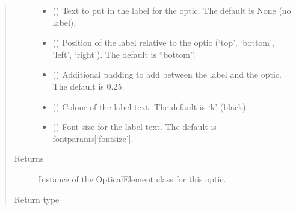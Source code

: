 \documentclass[letterpaper,10pt,english]{sphinxmanual}
\begin{document}
\begin{fulllineitems}
\begin{fulllineitems}
\begin{quote}
\begin{description}
\begin{itemize}
\item {} 
\sphinxAtStartPar
{} (\sphinxstyleliteralemphasis{\sphinxupquote{, }}) \textendash{} Text to put in the label for the optic. The default is None (no label).

\item {} 
\sphinxAtStartPar
{} (\sphinxstyleliteralemphasis{\sphinxupquote{, }}) \textendash{} Position of the label relative to the optic (‘top’, ‘bottom’, ‘left’, ‘right’).
The default is “bottom”.

\item {} 
\sphinxAtStartPar
{} (\sphinxstyleliteralemphasis{\sphinxupquote{, }}) \textendash{} Additional padding to add between the label and the optic.
The default is 0.25.

\item {} 
\sphinxAtStartPar
{} (\sphinxstyleliteralemphasis{\sphinxupquote{, }}) \textendash{} Colour of the label text. The default is ‘k’ (black).

\item {} 
\sphinxAtStartPar
{} (\sphinxstyleliteralemphasis{\sphinxupquote{, }}) \textendash{} Font size for the label text. The default is fontparams{[}‘fontsize’{]}.

\end{itemize}

\item[{Returns}] \leavevmode
\sphinxAtStartPar
Instance of the OpticalElement class for this optic.

\item[{Return type}] \leavevmode
\sphinxAtStartPar
{\hyperref[\detokenize{index:pyopticaltable.OpticalElement}]{}}

\end{description}\end{quote}


\end{fulllineitems}
\end{fulllineitems}
\end{document}
